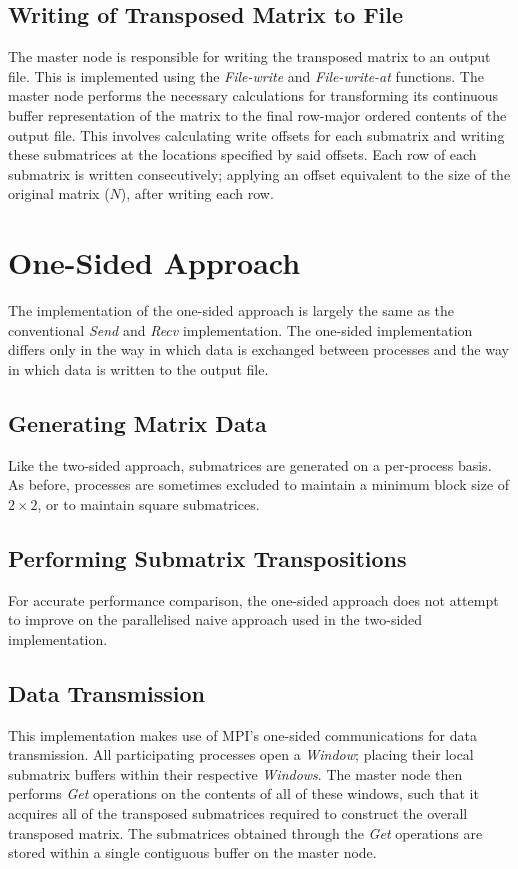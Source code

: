 \documentclass[journal,10pt,a4paper]{IEEEtran}
\begin{document}
\subsection{Writing of Transposed Matrix to File}

The master node is responsible for writing the transposed matrix to an output file. This is implemented using the \textit{File-write} and \textit{File-write-at} functions. The master node performs the necessary calculations for transforming its continuous buffer representation of the matrix to the final row-major ordered contents of the output file. This involves calculating write offsets for each submatrix and writing these submatrices at the locations specified by said offsets. Each row of each submatrix is written consecutively; applying an offset equivalent to the size of the original matrix ($N$), after writing each row.



\section{One-Sided Approach}

The implementation of the one-sided approach is largely the same as the conventional \textit{Send} and \textit{Recv} implementation. The one-sided implementation differs only in the way in which data is exchanged between processes and the way in which data is written to the output file.

\subsection{Generating Matrix Data}
Like the two-sided approach, submatrices are generated on a per-process basis. As before, processes are sometimes excluded to maintain a minimum block size of $2 \times 2$, or to maintain square submatrices.


\subsection{Performing Submatrix Transpositions}
For accurate performance comparison, the one-sided approach does not attempt to improve on the parallelised naive approach used in the two-sided implementation.

\subsection{Data Transmission}
This implementation makes use of MPI's one-sided communications for data transmission. All participating processes open a \textit{Window}; placing their local submatrix buffers within their respective \textit{Windows}. The master node then performs \textit{Get} operations on the contents of all of these windows, such that it acquires all of the transposed submatrices required to construct the overall transposed matrix. The submatrices obtained through the \textit{Get} operations are stored within a single contiguous buffer on the master node.
\end{document}
